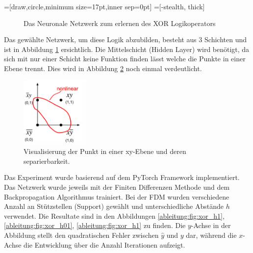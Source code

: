 =[draw,circle,minimum size=17pt,inner sep=0pt]
=[-stealth, thick]
\begin{figure}
	\centering
	\caption{Das Neuronale Netzwerk zum erlernen des XOR Logikoperators}
	\label{ableitung:fig:nn-result-net}
\end{figure}
Das gewählte Netzwerk, um diese Logik abzubilden, besteht aus 3 Schichten und ist in Abbildung \ref{ableitung:fig:nn-result-net} ersichtlich. Die Mittelschicht (Hidden Layer) wird benötigt, da sich mit nur einer Schicht keine Funktion finden lässt welche die Punkte in einer Ebene trennt. Dies wird in Abbildung \ref{ableitung:fig:visualisation-surface} noch einmal verdeutlicht.
\begin{figure}
	\centering
	\includegraphics[width=0.3\textwidth]{papers/ableitung/images/xor_surface.png}
	\caption{Visualisierung der Punkt in einer xy-Ebene und deren separierbarkeit.}
	\label{ableitung:fig:visualisation-surface}
\end{figure}
Das Experiment wurde basierend auf dem PyTorch Framework implementiert. Das Netzwerk wurde jeweils mit der Finiten Differenzen Methode und dem Backpropagation Algorithmus trainiert. Bei der FDM wurden verschiedene Anzahl an Stützstellen (Support) gewählt und unterschiedliche Abstände $h$ verwendet. Die Resultate sind in den Abbildungen \ref{ableitung:fig:xor_h1}, \ref{ableitung:fig:xor_h01}, \ref{ableitung:fig:xor_h1} zu finden. Die $y$-Achse in der Abbildung stellt den quadratischen Fehler zwischen $\hat{y}$ und $y$ dar, während die $x$-Achse die Entwicklung über die Anzahl Iterationen aufzeigt.

